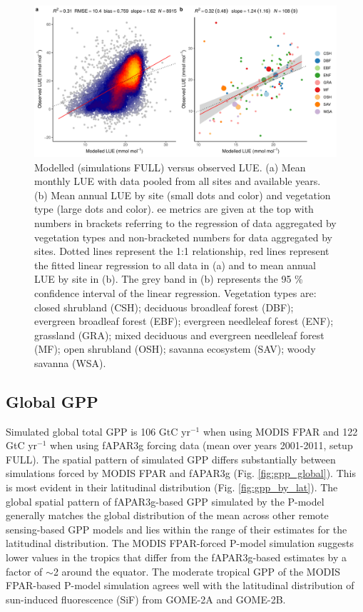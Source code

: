 \documentclass[gmd, manuscript]{copernicus}
\begin{document}
 \begin{figure}[t]
\includegraphics[width=12cm]{fig/modobs_lue_FULL.pdf}
    \caption{Modelled (simulations FULL) versus observed LUE. (a) Mean monthly LUE with data pooled from all sites and available years. (b) Mean annual LUE by site (small dots and color) and vegetation type (large dots and color). ee metrics are given at the top with numbers in brackets referring to the regression of data aggregated by vegetation types and non-bracketed numbers for data aggregated by sites. Dotted lines represent the 1:1 relationship, red lines represent the fitted linear regression to all data in (a) and to mean annual LUE by site in (b). The grey band in (b) represents the 95 \% confidence interval of the linear regression. Vegetation types are: closed shrubland (CSH); deciduous broadleaf forest (DBF); evergreen broadleaf forest (EBF); evergreen needleleaf forest (ENF); grassland (GRA); mixed deciduous and evergreen needleleaf forest (MF); open shrubland (OSH); savanna ecosystem (SAV); woody savanna (WSA). }
    \label{fig:lue}
\end{figure}


\subsection{Global GPP}

Simulated global total GPP is 106 GtC yr$^{-1}$ when using MODIS FPAR and 122 GtC yr$^{-1}$ when using fAPAR3g forcing data (mean over years 2001-2011, setup FULL). The spatial pattern of simulated GPP differs substantially between simulations forced by MODIS FPAR and fAPAR3g (Fig. \ref{fig:gpp_global}). This is most evident in their latitudinal distribution (Fig. \ref{fig:gpp_by_lat}). The global spatial pattern of fAPAR3g-based GPP simulated by the P-model generally matches the global distribution of the mean across other remote sensing-based GPP models and lies within the range of their estimates for the latitudinal distribution. The MODIS FPAR-forced P-model simulation suggests lower values in the tropics that differ from the fAPAR3g-based estimates by a factor of $\sim$2 around the equator. The moderate tropical GPP of the MODIS FPAR-based P-model simulation agrees well with the latitudinal distribution of sun-induced fluorescence (SiF) from GOME-2A and GOME-2B.
\end{document}
